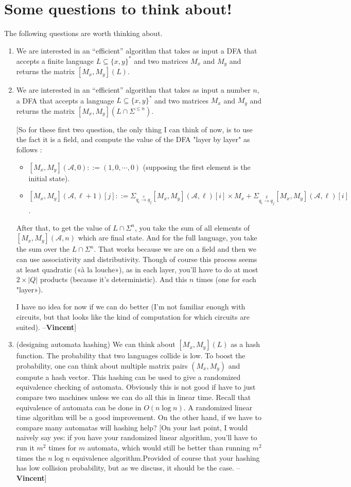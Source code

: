 \documentclass[english,course]{lecture}
\newcommand{\Mxy}[1]{[M_x,M_y](#1)}
\newcommand{\defs}{::=}
\newcommand\vincent[1]{{\color{blue} [#1 --\textbf{Vincent}]}}
\begin{document}
\section{Some questions to think about!}
The following questions are worth thinking about.
\begin{enumerate}
\item We are interested in an ``efficient'' algorithm that takes as input a DFA that accepts a finite language $L \subseteq \{x,y\}^*$ and two matrices $M_x$ and $M_y$ and returns the matrix $\Mxy L$.
\item We are interested in an ``efficient'' algorithm that takes as input a number $n$, a DFA that accepts a language $L \subseteq \{x,y\}^*$ and two matrices $M_x$ and $M_y$ and returns the matrix $\Mxy {L \cap \Sigma^{\leq n}}$.

\vincent{So for these first two question, the only thing I can think of now, is to use the fact it is a field, and compute the value of the DFA "layer by layer" as follows :
\begin{itemize}
    \item $\Mxy{\mathcal{A},0} \defs (1,0,\cdots,0)$ (supposing the first element is the initial state).
    \item $\Mxy{\mathcal{A},\ell+1}[j] \defs \Sigma_{q_i \xrightarrow{x} q_j} \Mxy{\mathcal{A},\ell}[i] \times M_x + \Sigma_{q_i \xrightarrow{y} q_j} \Mxy{\mathcal{A},\ell}[i]$.
\end{itemize}
After that, to get the value of $L \cap \Sigma^n$, you take the sum of all elements of $\Mxy{\mathcal{A},n}$ which are final state. And for the full language, you take the sum over the $L \cap \Sigma^n$.
That works because we are on a field and then we can use associativity and distributivity.
Though of course this process seems at least quadratic («à la louche»), as in each layer, you'll have to do at most $2 \times |Q|$ products (because it's deterministic). And this $n$ times (one for each "layer»).

I have no idea for now if we can do better (I'm not familiar enough with circuits, but that looks like the kind of computation for which circuits are suited).
}

\item (designing automata hashing) We can think about $\Mxy L$ as a hash function. The probability that two languages collide is low. To boost the probability, one can think about multiple matrix pairs $(M_x, M_y)$ and compute a hash vector. This hashing can be used to give a randomized equivalence checking of automata. Obviously this is not good if have to just compare two machines unless we can do all this in linear time. Recall that equivalence of automata can be done in $O(n \log n)$. A randomized linear time algorithm will be a good improvement. On the other hand, if we have to compare many automatas will hashing help?
\vincent{On your last point, I would naively say yes: if you have your randomized linear algorithm, you'll have to run it $m^2$ times for $m$ automata, which would still be better than running $m^2$ times the $n \log n$ equivalence algorithm.Provided of course that your hashing has low collision probability, but as we discuss, it should be the case.}


\end{enumerate}
\end{document}
